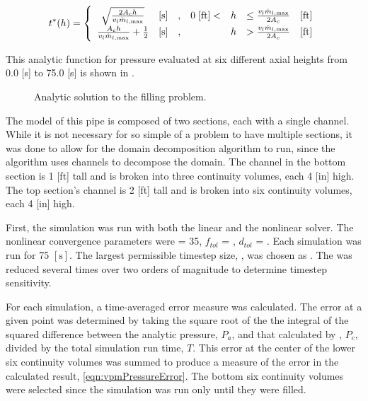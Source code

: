 \begin{equation}
\label{eqn:vmpTimeStar}
t^{*}(h)= 
 \left\{
\begin{array}{cclrcll}
\sqrt{\frac{2 A_c h}{v_{l} \dot{m}_{l,\text{max}}}} & [ \text{s} ] & , & 0\; [ \text{ft}] < & h & \leq \frac{v_l \dot{m}_{l,\text{max}}}{2 A_c} & [\text{ft}] \\
\frac{ A_c h }{v_{l} \dot{m}_{l,\text{max}}} + \onehalf & [ \text{s} ] & , &                & h & > \frac{v_l \dot{m}_{l,\text{max}}}{2 A_c} & [\text{ft}]
\end{array}\right.
\end{equation}

This analytic function for pressure evaluated at six different axial heights from 0.0 [s] to 75.0 [s] is shown in .

\begin{figure}[h!tb]
\centering

\caption{Analytic solution to the filling problem.}
\label{fig:vmpAnalyticSol}
\end{figure}

The \cobra{} model of this pipe is composed of two sections, each with a single channel.
While it is not necessary for so simple of a problem to have multiple sections, it was done to allow for the domain decomposition algorithm to run, since the algorithm uses channels to decompose the domain.
The channel in the bottom section is 1 [ft] tall and is broken into three continuity volumes, each 4 [in] high.
The top section's channel is 2 [ft] tall and is broken into six continuity volumes, each 4 [in] high.

First, the simulation was run with both the linear and the nonlinear solver.
The nonlinear convergence parameters were \kmax{} = 35, $f_{tol}$ = , $d_{tol}$ = . 
Each simulation was run for 75 $[ \text{s} ]$.
The largest permissible timestep size, \dtmax{}, was chosen as .
The \dtmax{} was reduced several times over two orders of magnitude to determine timestep sensitivity.

For each simulation, a time-averaged error measure was calculated.
The error at a given point was determined by taking the square root of the the integral of the squared difference between the analytic pressure, $P_{a}$, and that calculated by \cobra{}, $P_{c}$, divided by the total simulation run time, $T$.
This error at the center of the lower six continuity volumes was summed to produce a measure of the error in the calculated result, \eqref{eqn:vpmPressureError}.
The bottom six continuity volumes were selected since the simulation was run only until they were filled.

